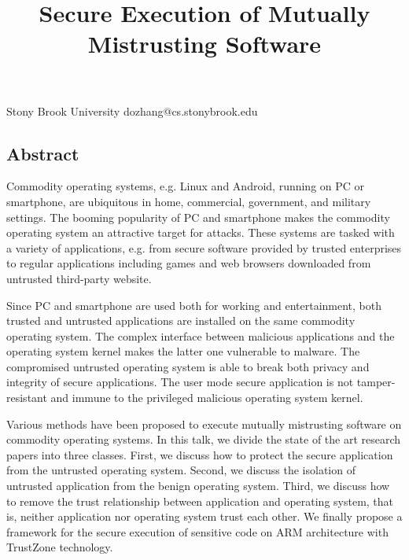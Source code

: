 \documentclass[10pt,reprint]{socc14}
\begin{document}
\date{}

\title{Secure Execution of Mutually Mistrusting Software}
\subtitle{}


           {Stony Brook University}
		   {dozhang@cs.stonybrook.edu}

\maketitle
%
%

\subsection*{Abstract}
Commodity operating systems, e.g. Linux and Android, running on PC or
smartphone, are ubiquitous in home, commercial, government, and military
settings. The booming popularity of PC and smartphone makes the commodity
operating system an attractive target for attacks. These systems are tasked
with a variety of applications, e.g. from secure software provided by trusted
enterprises to regular applications including games and web browsers downloaded
from untrusted third-party website.

Since PC and smartphone are used both for working and entertainment, both
trusted and untrusted applications are installed on the same commodity
operating system. The complex interface between malicious applications and the
operating system kernel makes the latter one vulnerable to malware. The
compromised untrusted operating system is able to break both privacy and
integrity of secure applications. The user mode secure application is not
tamper-resistant and immune to the privileged malicious operating system
kernel.

Various methods have been proposed to execute mutually mistrusting software on
commodity operating systems. In this talk, we divide the state of the art
research papers into three classes. First, we discuss how to protect the secure
application from the untrusted operating system. Second, we discuss the
isolation of untrusted application from the benign operating system. Third, we
discuss how to remove the trust relationship between application and operating
system, that is, neither application nor operating system trust each other. We
finally propose a framework for the secure execution of sensitive code on ARM
architecture with TrustZone technology.











\end{document}
